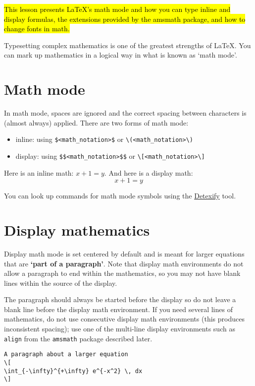 \documentclass{article}
\begin{document}
\hl{This lesson presents LaTeX’s math mode and how you can type inline and display formulas, the extensions provided by the amsmath package, and how to change fonts in math.}
\vspace{0.5cm}

Typesetting complex mathematics is one of the greatest strengths of LaTeX. You can mark up mathematics in a logical way in what is known as ‘math mode’.

\section{Math mode}
In math mode, spaces are ignored and the correct spacing between characters is (almost always) applied. There are two forms of math mode:

\begin{itemize}
    \item inline: using \verb|$<math_notation>$| or \verb|\(<math_notation>\)|
    \item display: using \verb|$$<math_notation>$$| or \verb|\[<math_notation>\]|
\end{itemize}
\vspace{0.5cm}

Here is an inline math: $x + 1 = y$. And here is a display math: $$x + 1 = y$$

You can look up commands for math mode symbols using the \href{https://detexify.kirelabs.org/classify.html}{Detexify} tool.

\section{Display mathematics}
Display math mode is set centered by default and is meant for larger equations that are \textbf{‘part of a paragraph’}. Note that display math environments do not allow a paragraph to end within the mathematics, so you may not have blank lines within the source of the display.

The paragraph should always be started before the display so do not leave a blank line before the display math environment. If you need several lines of mathematics, do not use consecutive display math environments (this produces inconsistent spacing); use one of the multi-line display environments such as \verb|align| from the \verb|amsmath| package described later.

\begin{verbatim}
A paragraph about a larger equation
\[
\int_{-\infty}^{+\infty} e^{-x^2} \, dx
\]
\end{verbatim}
\end{document}
